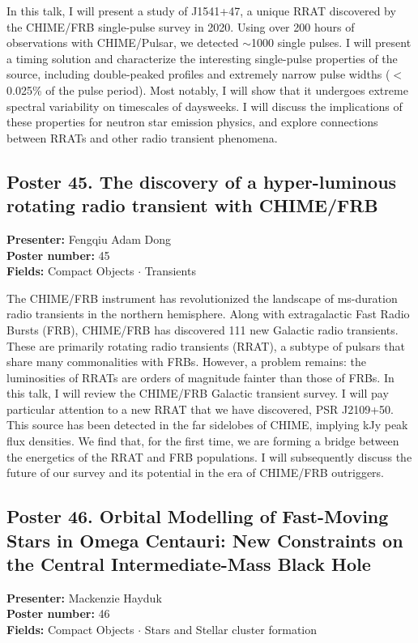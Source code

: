 In this talk, I will present a study of J1541+47, a unique RRAT discovered by the CHIME/FRB single-pulse survey in 2020. Using over 200 hours of observations with CHIME/Pulsar, we detected $\sim$1000 single pulses. I will present a timing solution and characterize the interesting single-pulse properties of the source, including double-peaked profiles and extremely narrow pulse widths ($<$0.025\% of the pulse period). Most notably, I will show that it undergoes extreme spectral variability on timescales of daysweeks. I will discuss the implications of these properties for neutron star emission physics, and explore connections between RRATs and other radio transient phenomena.

\hypertarget{poster-abstract-talk-169}{}\label{poster-abstract-page-talk-169}
\subsection*{Poster 45. The discovery of a hyper-luminous rotating radio transient with CHIME/FRB}
\textbf{Presenter:} Fengqiu Adam Dong\\
\textbf{Poster number:} 45\\
\textbf{Fields:} Compact Objects $\cdot$ Transients

The CHIME/FRB instrument has revolutionized the landscape of ms-duration radio transients in the northern hemisphere. Along with extragalactic Fast Radio Bursts (FRB), CHIME/FRB has discovered 111 new Galactic radio transients. These are primarily rotating radio transients (RRAT), a subtype of pulsars that share many commonalities with FRBs. However, a problem remains: the luminosities of RRATs are orders of magnitude fainter than those of FRBs. In this talk, I will review the CHIME/FRB Galactic transient survey. I will pay particular attention to a new RRAT that we have discovered, PSR J2109+50. This source has been detected in the far sidelobes of CHIME, implying kJy peak flux densities. We find that, for the first time, we are forming a bridge between the energetics of the RRAT and FRB populations. I will subsequently discuss the future of our survey and its potential in the era of CHIME/FRB outriggers.

\hypertarget{poster-abstract-talk-150}{}\label{poster-abstract-page-talk-150}
\subsection*{Poster 46. Orbital Modelling of Fast-Moving Stars in Omega Centauri: New Constraints on the Central Intermediate-Mass Black Hole}
\textbf{Presenter:} Mackenzie Hayduk\\
\textbf{Poster number:} 46\\
\textbf{Fields:} Compact Objects $\cdot$ Stars and Stellar cluster formation

